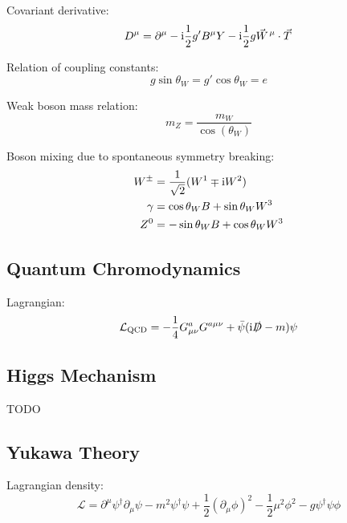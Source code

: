 		\noindent
		Covariant derivative:
		\begin{equation}
			D^\mu = \partial^\mu - \i \frac{1}{2} g' B^\mu Y - \i \frac{1}{2} g \vec{W}^\mu \cdot \vec{T}
		\end{equation}
		
		\noindent
		Relation of coupling constants:
		\begin{equation}
			g \sin\theta_W = g' \cos\theta_W = e
		\end{equation}

		\noindent
		Weak boson mass relation:
		\begin{equation}
			m_Z = \frac{m_W}{\cos(\theta_W)}
		\end{equation}
		
		\noindent
		Boson mixing due to spontaneous symmetry breaking:
		\begin{equation}
			\begin{aligned}
				W^\pm &= \frac{1}{\sqrt{2}}(W^1 \mp \mathrm{i} W^2) \\
				\gamma &= \cos\theta_W B + \sin\theta_W W^3 \\
				Z^0 &= -\sin\theta_W B + \cos\theta_W W^3
			\end{aligned}
		\end{equation}


	\subsection{Quantum Chromodynamics} 
		Lagrangian:
		\begin{equation}
			\mathcal{L}_\text{QCD} = -\frac{1}{4} G^a_{\mu\nu} G^{a\mu\nu} + \bar{\psi}(\mathrm{i}\slashed{D}-m)\psi
		\end{equation}
		


	\subsection{Higgs Mechanism} TODO

	\subsection{Yukawa Theory}
		Lagrangian density:
		\begin{equation}
			\mathcal{L}=\partial^{\mu}\psi^{\dagger}\partial_{\mu}\psi-m^{2}\psi^{\dagger}\psi+\frac{1}{2}(\partial_{\mu}\phi)^{2}-\frac{1}{2}\mu^{2}\phi^{2}-g\psi^{\dagger}\psi\phi
		\end{equation}

